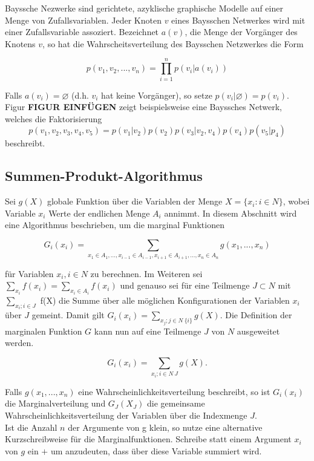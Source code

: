 \documentclass[12pt,a4paper]{scrartcl}
\numberwithin{equation}{section}
\begin{document}
Bayssche Nezwerke sind gerichtete, azyklische graphische Modelle auf einer Menge von Zufallsvariablen. 
Jeder Knoten $v$ eines Baysschen Netwerkes wird mit einer Zufallsvariable assoziert. Bezeichnet $a(v)$, die Menge
der Vorgänger des Knotens $v$, so hat die Wahrscheitsverteilung des Baysschen Netzwerkes die Form

\begin{equation}
 p(v_{1},v_{2},...,v_{n}) = \prod_{i=1}^n p(v_{i}|a(v_i))
\end{equation}

Falls $a(v_i) = \varnothing $ (d.h. $v_i$ hat keine Vorgänger), so setze $p(v_i| \varnothing) = p(v_i)$.
Figur \textbf{FIGUR EINFÜGEN} zeigt beispielsweise eine Bayssches Netwerk, welches die Faktorisierung 
$$
p(v_1,v_2,v_3,v_4,v_5) = p(v_1|v_2)p(v_2)p(v_3|v_2,v_4)p(v_4)p(v_5|p_4)
$$
beschreibt. 

\subsection{Summen-Produkt-Algorithmus}

Sei $g(X)$ globale Funktion über die Variablen der Menge $X = \{ x_i : i \in N \}$, wobei Variable $x_i$ Werte
der endlichen Menge $A_i$ annimmt.
In diesem Abschnitt wird eine Algorithmus beschrieben, um die marginal Funktionen 

\begin{equation}
 G_i(x_i) = \sum_{x_1 \in A_1,...,x_{i-1} \in A_{i-1},x_{i+1} \in A_{i+1},...,x_n \in A_n} g(x_1,...,x_n)
\end{equation}

für Variablen $x_i, i \in N $ zu berechnen. Im Weiteren sei $\sum_{x_i} f(x_i) = \sum_{x_i \in A_i} f(x_i)$ und genauso
sei für eine Teilmenge $J \subset N$ mit $\sum_{x_i; i \in J}$ f(X) die Summe über alle möglichen Konfigurationen der Variablen $x_i$
über $J$ gemeint. Damit gilt $G_i(x_i) = \sum_{x_j;j\in N \ \{i\}}g(X)$.
Die Definition der marginalen Funktion $G$ kann nun auf eine Teilmenge $J$ von $N$ ausgeweitet werden.

\begin{equation}
 G_i(x_i) = \sum_{x_i; i \in N \ J} g(X).
\end{equation}

Falls $g(x_1,...,x_n)$ eine Wahrscheinlichkeitsverteilung beschreibt, so ist $G_i(x_i)$ die Marginalverteilung und 
$G_{J}(X_J)$ die gemeinsame Wahrscheinlichkeitsverteilung der Variablen über die Indexmenge $J$.
\\
Ist die Anzahl $n$ der Argumente von g klein, so nutze eine alternative Kurzschreibweise für die Marginalfunktionen. 
Schreibe statt einem Argument $x_i$ von $g$ ein $+$ um anzudeuten, dass über diese Variable summiert wird.
\end{document}
